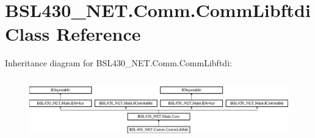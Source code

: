 \hypertarget{class_b_s_l430___n_e_t_1_1_comm_1_1_comm_libftdi}{}\section{B\+S\+L430\+\_\+\+N\+E\+T.\+Comm.\+Comm\+Libftdi Class Reference}
\label{class_b_s_l430___n_e_t_1_1_comm_1_1_comm_libftdi}
Inheritance diagram for B\+S\+L430\+\_\+\+N\+E\+T.\+Comm.\+Comm\+Libftdi\+:\begin{figure}[H]
\begin{center}
\leavevmode
\includegraphics[height=2.731707cm]{class_b_s_l430___n_e_t_1_1_comm_1_1_comm_libftdi}
\end{center}
\end{figure}
